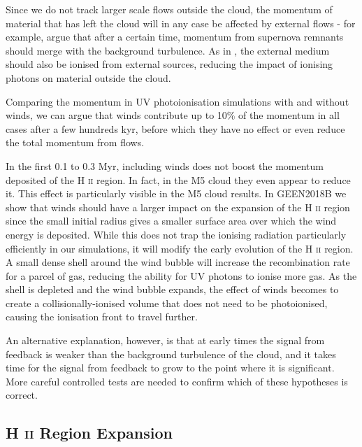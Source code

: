 \documentclass[a4paper,fleqn,usenatbib]{mnras}
\newcommand{\HII}{H \textsc{ii}\xspace}
\begin{document}
Since we do not track larger scale flows outside the cloud, the momentum of material that has left the cloud will in any case be affected by external flows - for example, \cite{Cioffi1988} argue that after a certain time, momentum from supernova remnants should merge with the background turbulence. As in \cite{Haid2018}, the external medium should also be ionised from external sources, reducing the impact of ionising photons on material outside the cloud.

Comparing the momentum in UV photoionisation simulations with and without winds, we can argue that winds contribute up to 10\% of the momentum in all cases after a few hundreds kyr, before which they have no effect or even reduce the total momentum from flows.

In the first 0.1 to 0.3 Myr, including winds does not boost the momentum deposited of the \HII region. In fact, in the M5 cloud they even appear to reduce it. This effect is particularly visible in the M5 cloud results. In GEEN2018B we show that winds should have a larger impact on the expansion of the \HII region since the small initial radius gives a smaller surface area over which the wind energy is deposited. While this does not trap the ionising radiation particularly efficiently in our simulations, it will modify the early evolution of the \HII region. A small dense shell around the wind bubble will increase the recombination rate for a parcel of gas, reducing the ability for UV photons to ionise more gas. As the shell is depleted and the wind bubble expands, the effect of winds becomes to create a collisionally-ionised volume that does not need to be photoionised, causing the ionisation front to travel further.

An alternative explanation, however, is that at early times the signal from feedback is weaker than the background turbulence of the cloud, and it takes time for the signal from feedback to grow to the point where it is significant. More careful controlled tests are needed to confirm which of these hypotheses is correct.


\subsection{\HII Region Expansion}
\end{document}
